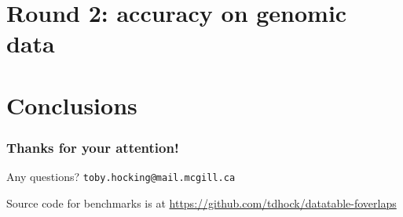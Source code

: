 \documentclass{beamer}
\begin{document}




\section{Round 2: accuracy on genomic data}

\section{Conclusions}

\begin{frame}
  \frametitle{Thanks for your attention!}
  Any questions? \texttt{toby.hocking@mail.mcgill.ca}

  \vskip 1cm

  Source code for benchmarks is at
  \url{https://github.com/tdhock/datatable-foverlaps}
\end{frame}
\end{document}
